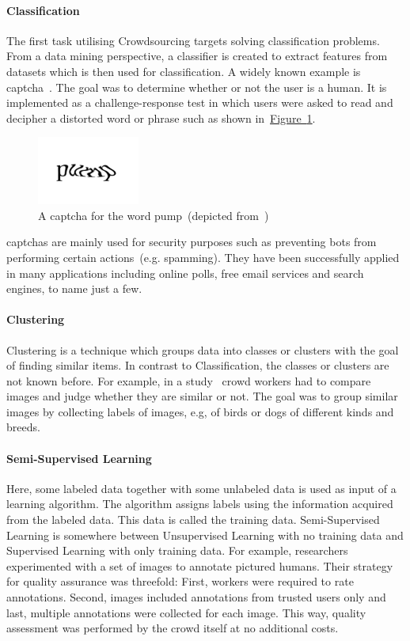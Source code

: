 \paragraph{Classification} The first task utilising Crowdsourcing targets solving classification problems. From a data mining perspective, a classifier is created to extract features from datasets which is then used for classification. A widely known example is \gls{captcha}~\cite{ahn2003}. The goal was to determine whether or not the user is a human. 
It is implemented as a challenge-response test in which users were asked to read and decipher a distorted word or phrase such as shown in~\hyperref[fig:captcha]{Figure~\ref*{fig:captcha}}.
\begin{figure}
	 \centering
	 \includegraphics[width=0.3\textwidth]{drawio/CAPCHA}
	 \caption{A \gls{captcha} for the word \guillemotright pump\guillemotleft~(depicted from~\cite{ahn2003})}\label{fig:captcha}
\end{figure}  
\gls{captcha}s are mainly used for security purposes such as preventing bots from performing certain actions~(e.g. spamming). They have been successfully applied in many applications including online polls, free email services and search engines, to name just a few. 

\paragraph{Clustering} Clustering is a technique which groups data into classes or clusters with the goal of finding similar items. In contrast to Classification, the classes or clusters are not known before.
For example, in a study~\cite{vinayak2016} crowd workers had to compare images and judge whether they are similar or not. The goal was to group similar images by collecting labels of images, e.g, of birds or dogs of different kinds and breeds. 

\paragraph{Semi-Supervised Learning} Here, some labeled data together with some unlabeled data is used as input of a learning
algorithm. The algorithm assigns labels using the information acquired from the labeled data. This data is called the training data. Semi-Supervised Learning is somewhere between Unsupervised Learning with no training data and Supervised Learning with only training data. For example, researchers~\cite{sorokin2008} experimented with a set of images to annotate pictured humans. Their strategy for quality assurance was threefold: First, workers were required to rate annotations. Second, images included annotations from trusted users only and last, multiple annotations were collected for each image. This way, quality assessment was performed by the crowd itself at no additional costs. 

